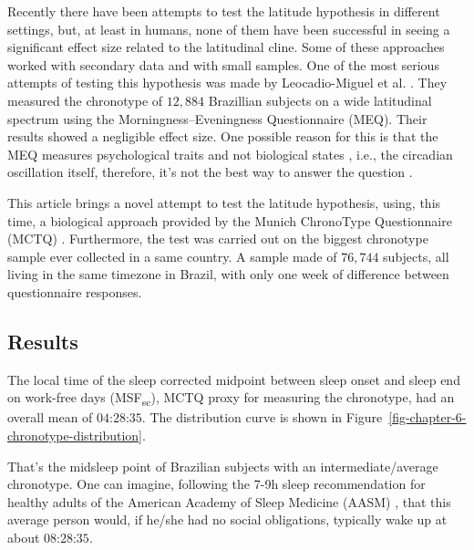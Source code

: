 \documentclass[
12pt,
openright,
oneside,
a4paper,
chapter=TITLE,
section=TITLE,
french,
spanish,
brazil,
english
]{abntex2}\usepackage{array}
\begin{document}
Recently there have been attempts to test the latitude hypothesis in
different settings, but, at least in humans, none of them have been
successful in seeing a significant effect size related to the
latitudinal cline. Some of these approaches worked with secondary data
and with small samples. One of the most serious attempts of testing this
hypothesis was made by Leocadio-Miguel et al.
\autocite*{leocadio-miguel2017}. They measured the chronotype of
\(12,884\) Brazillian subjects on a wide latitudinal spectrum using the
Morningness--Eveningness Questionnaire (MEQ). Their results showed a
negligible effect size. One possible reason for this is that the MEQ
measures psychological traits and not biological states
\autocite{roenneberg2019}, i.e., the circadian oscillation itself,
therefore, it's not the best way to answer the question
\autocite{leocadio-miguel2014}.


This article brings a novel attempt to test the latitude hypothesis,
using, this time, a biological approach provided by the Munich
ChronoType Questionnaire (MCTQ) \autocite{roenneberg2003}. Furthermore,
the test was carried out on the biggest chronotype sample ever collected
in a same country. A sample made of \(76,744\) subjects, all living in
the same timezone in Brazil, with only one week of difference between
questionnaire responses.

\subsection{Results}\label{results}

The local time of the sleep corrected midpoint between sleep onset and
sleep end on work-free days (MSF\textsubscript{sc}), MCTQ proxy for
measuring the chronotype, had an overall mean of \(\text{04:28:35}\).
The distribution curve is shown in
Figure~\ref{fig-chapter-6-chronotype-distribution}.

That's the midsleep point of Brazilian subjects with an
intermediate/average chronotype. One can imagine, following the 7-9h
sleep recommendation for healthy adults of the American Academy of Sleep
Medicine (AASM) \autocite{watson2015}, that this average person would,
if he/she had no social obligations, typically wake up at about
\(\text{08:28:35}\).
\end{document}
